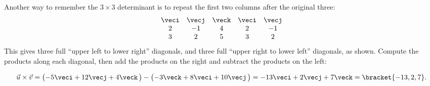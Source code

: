 

Another way to remember the $3\times3$ determinant is to
repeat the first two columns after the original three:
\[
 \begin{matrix}
  \veci&\vecj&\veck&\veci&\vecj \\
  2&-1&4&2&-1\\
  3&2&5&3&2
 \end{matrix}
\]
This gives three full ``upper left to lower right'' diagonals, and three full ``upper right to lower left'' diagonals, as shown. Compute the products along each diagonal, then add the products on the right and subtract the products on the left:

\begin{center}\end{center}
\[\vec u\times\vec v = \bigl(-5\veci+12\vecj+4\veck\,\bigr) - \bigl(-3\veck+8\veci+10\vecj\,\bigr) = -13\veci+2\vecj+7\veck =\bracket{-13,2,7}.\]

